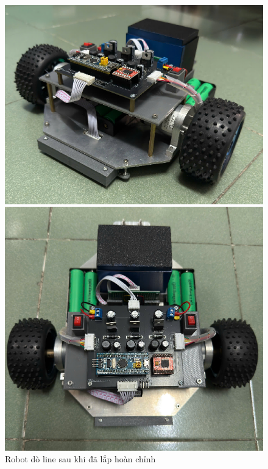                \begin{figure}[H]
                    \centering
                    \begin{minipage}{0.42\textwidth}
                         \centering
                         \includegraphics[width=\linewidth]{pictures/chapter8/xe_full1.png}
                    \end{minipage}\hfill
                    \begin{minipage}{0.42\textwidth}
                         \centering
                         \includegraphics[width=\linewidth]{pictures/chapter8/xe_full2.png}
                    \end{minipage}
                    \caption{Robot dò line sau khi đã lắp hoàn chỉnh}
                    \label{xe_full}
               \end{figure}
